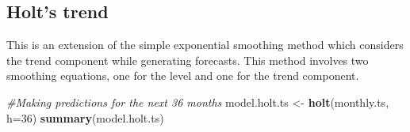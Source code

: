 \documentclass[
]{article}
\newenvironment{Shaded}{\begin{snugshade}}{\end{snugshade}}
\newcommand{\CommentTok}[1]{\textcolor[rgb]{0.56,0.35,0.01}{\textit{#1}}}
\newcommand{\DataTypeTok}[1]{\textcolor[rgb]{0.13,0.29,0.53}{#1}}
\newcommand{\DecValTok}[1]{\textcolor[rgb]{0.00,0.00,0.81}{#1}}
\newcommand{\KeywordTok}[1]{\textcolor[rgb]{0.13,0.29,0.53}{\textbf{#1}}}
\newcommand{\NormalTok}[1]{#1}
\newcommand{\StringTok}[1]{\textcolor[rgb]{0.31,0.60,0.02}{#1}}
\begin{document}
\hypertarget{holts-trend}{%
\subsection{Holt's trend}\label{holts-trend}}

This is an extension of the simple exponential smoothing method which
considers the trend component while generating forecasts. This method
involves two smoothing equations, one for the level and one for the
trend component.

\begin{Shaded}
\begin{Highlighting}[]
\CommentTok{#Making predictions for the next 36 months}
\NormalTok{model.holt.ts <-}\StringTok{ }\KeywordTok{holt}\NormalTok{(monthly.ts, }\DataTypeTok{h=}\DecValTok{36}\NormalTok{)}
\KeywordTok{summary}\NormalTok{(model.holt.ts)}
\end{Highlighting}
\end{Shaded}
\end{document}
